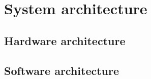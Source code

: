 
\section{System architecture}
\label{sec:system-architecture}

\subsection{Hardware architecture}
\label{sec:hardw-arch}

\subsection{Software architecture}
\label{sec:softw-arch}




